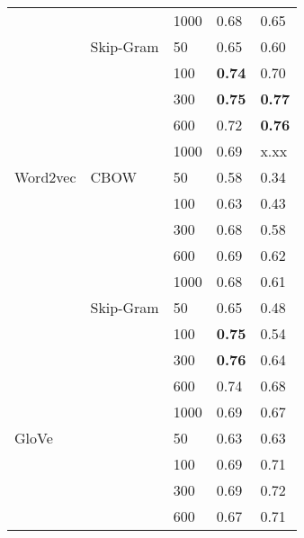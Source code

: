 \begin{table}[]
\begin{minipage}{.65\textwidth}
\begin{tabular}{@{}lllll@{}}
                        &               & 1000 & 0.68             & 0.65            \\ \cmidrule(lr){2-5}
                        & Skip-Gram     & 50   & 0.65             & 0.60            \\
                        &               & 100  & \textbf{0.74}    & 0.70            \\
                        &               & 300  & \textbf{0.75}    & \textbf{0.77}   \\
                        &               & 600  & 0.72             & \textbf{0.76}   \\
                        &               & 1000 & 0.69             & x.xx            \\ \cmidrule(r){1-5}
    Word2vec            & CBOW          & 50   & 0.58             & 0.34            \\
                        &               & 100  & 0.63             & 0.43            \\
                        &               & 300  & 0.68             & 0.58            \\
                        &               & 600  & 0.69             & 0.62            \\
                        &               & 1000 & 0.68             & 0.61            \\ \cmidrule(lr){2-5}
                        & Skip-Gram     & 50   & 0.65             & 0.48            \\
                        &               & 100  & \textbf{0.75}    & 0.54            \\
                        &               & 300  & \textbf{0.76}    & 0.64            \\
                        &               & 600  & 0.74             & 0.68            \\
                        &               & 1000 & 0.69             & 0.67            \\ \cmidrule(r){1-5}
    GloVe               &               & 50   & 0.63             & 0.63            \\
                        &               & 100  & 0.69             & 0.71            \\
                        &               & 300  & 0.69             & 0.72            \\
                        &               & 600  & 0.67             & 0.71            \\

\end{tabular}
\end{minipage}
\end{table}
